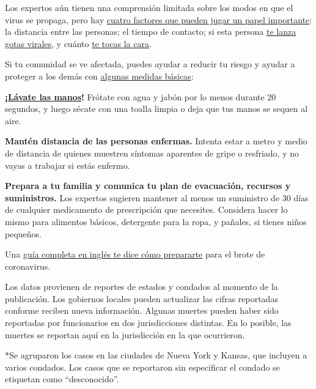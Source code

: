 Los expertos aún tienen una comprensión limitada sobre los modos en que
el virus se propaga, pero hay
\href{https://www.nytimes.com/es/2020/03/03/espanol/ciencia-y-tecnologia/coronavirus-como-se-transmite.html}{cuatro
factores que pueden jugar un papel importante}: la distancia entre las
personas; el tiempo de contacto; si esta persona
\href{https://www.nytimes.com/es/2020/07/08/espanol/ciencia-y-tecnologia/coronavirus-aire-aerosoles.html}{te
lanza gotas virales}, y cuánto
\href{https://www.nytimes.com/es/2020/03/06/espanol/estilos-de-vida/no-te-toques-la-cara.html}{te
tocas la cara}.

Si tu comunidad se ve afectada, puedes ayudar a reducir tu riesgo y
ayudar a proteger a los demás con
\href{https://www.nytimes.com/es/article/el-coronavirus-proteger-preparar.html}{algunas
medidas básicas}:

\textbf{¡\href{https://www.nytimes.com/es/2020/03/19/espanol/ciencia-y-tecnologia/como-lavarse-las-manos-coronavirus.html}{Lávate
las manos}!} Frótate con agua y jabón por lo menos durante 20 segundos,
y luego sécate con una toalla limpia o deja que tus manos se sequen al
aire.

\textbf{Mantén distancia de las personas enfermas.} Intenta estar a
metro y medio de distancia de quienes muestren síntomas aparentes de
gripe o resfriado, y no vayas a trabajar si estás enfermo.

\textbf{Prepara a tu familia y comunica tu plan de evacuación, recursos
y suministros.} Los expertos sugieren mantener al menos un suministro de
30 días de cualquier medicamento de prescripción que necesites.
Considera hacer lo mismo para alimentos básicos, detergente para la
ropa, y pañales, si tienes niños pequeños.

Una
\href{https://www.nytimes.com/interactive/2020/world/coronavirus-tips-advice.html}{guía
completa en inglés te dice cómo prepararte} para el brote de
coronavirus.

Los datos provienen de reportes de estados y condados al momento de la
publicación. Los gobiernos locales pueden actualizar las cifras
reportadas conforme reciben nueva información. Algunas muertes pueden
haber sido reportadas por funcionarios en dos jurisdicciones distintas.
En lo posible, las muertes se reportan aquí en la jurisdicción en la que
ocurrieron.

*Se agruparon los casos en las ciudades de Nueva York y Kansas, que
incluyen a varios condados. Los casos que se reportaron sin especificar
el condado se etiquetan como ``desconocido''.

